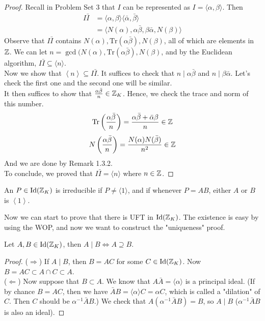 \documentclass[12pt,twoside=semi,openright,numbers=noenddot]{scrbook}
\begin{document}
\begin{proof}
    Recall in Problem Set 3 that $I$ can be represented as $I = \langle \alpha, \beta \rangle$. Then 
    \begin{align*}
        I\bar{I} &= \langle \alpha, \beta \rangle \langle \bar{\alpha}, \bar{\beta} \rangle \\
        &= \langle N(\alpha), \alpha\bar{\beta}, \beta\bar{\alpha}, N(\beta) \rangle
    \end{align*}
    Observe that $I\bar{I}$ contains $N(\alpha), \text{Tr}(\alpha\bar{\beta}), N(\beta)$, all of which are elements in $\mathbb Z$.
    We can let $n = \gcd(N(\alpha), \text{Tr}(\alpha\bar{\beta}), N(\beta)$, and by the Euclidean algorithm, $I\bar{I} \subseteq \langle n\rangle$. \\
    Now we show that $\left\langle n\right\rangle \subseteq I\bar{I}$. It suffices to check that $n \mid \alpha\bar{\beta}$ and 
    $n \mid \beta\bar{\alpha}$. Let's check the first one and the second one will be similar. \\
    It then suffices to show that $\frac{\alpha\bar{\beta}}{n} \in \mathbb Z_K$. Hence, we check the trace and norm of this number.
    $$ \text{Tr}\left(\frac{\alpha\bar{\beta}}{n}\right) = \frac{\alpha\bar{\beta} + \bar{\alpha}\beta}{n} \in \mathbb Z$$
    $$ N\left(\frac{\alpha\bar{\beta}}{n}\right) = \frac{N(\alpha)N(\bar{\beta})}{n^2}\in \mathbb Z$$
    And we are done by Remark 1.3.2. \\
    To conclude, we proved that $I\bar{I} = \langle n \rangle$ where $n \in \mathbb Z$.
\end{proof}

\begin{definition}
    An $P \in \text{Id}(\mathbb Z_K)$ is irreducible if $P \neq \langle 1\rangle$, and if whenever $P = AB$, either 
    $A$ or $B$ is $\left\langle 1\right\rangle$.
\end{definition}

Now we can start to prove that there is UFT in $\text{Id}(\mathbb Z_K)$. The existence is easy by using the WOP, and now we want to construct the 
"uniqueness" proof.

\begin{lemma}
    Let $A, B \in \text{Id}(\mathbb Z_K)$, then $A \mid B \Leftrightarrow A \supseteq B$.
\end{lemma}
    \begin{proof}
        ($\Rightarrow$) If $A \mid B$, then $B = AC$ for some $C \in \text{Id}(\mathbb Z_K)$. 
        Now $B = AC \subset A\cap C \subset A$. \\
        ($\Leftarrow$) Now suppose that $B \subset A$. We know that $A\bar{A} = \langle \alpha \rangle$ is a principal ideal.
        (If by chance $B = AC$, then we have $\bar{A}B = \langle \alpha \rangle C = \alpha C$, which is called a "dilation" of $C$.
        Then $C$ should be $\alpha^{-1}\bar{A}B$.) We check that $A(\alpha^{-1}\bar{A}B) = B$, so $A \mid B$ ($\alpha^{-1}\bar{A}B$ is also
        an ideal). 
    \end{proof}
\end{document}

